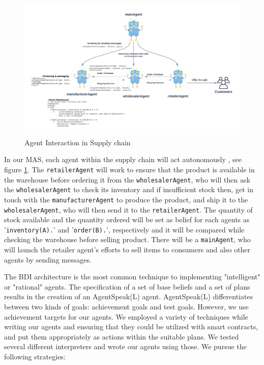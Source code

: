 \begin{figure}[h!]
    \centering
      \includegraphics[width=\linewidth]{includes/figures/agent.png} 
      \caption{Agent Interaction in Supply chain}
      \label{Agent Interaction}
    \end{figure}
  
\vspace{.5cm}

In our \ac{MAS}, each agent within the supply chain will act autonomously , see figure \ref{Agent Interaction}. The \texttt{retailerAgent} will work to ensure that the product is available in the warehouse before ordering it from the \texttt{wholesalerAgent}, who will then ask the \texttt{wholesalerAgent} to check its inventory and if insufficient stock then, get in touch with the \texttt{manufacturerAgent} to produce the product, and ship it to the \texttt{wholesalerAgent}, who will then send it to the \texttt{retailerAgent}. The quantity of stock available and the quantity ordered will be set as belief for each agents as '\texttt{inventory(A).}' and '\texttt{order(B).}', respectively and it will be compared while checking the warehouse before selling product. There will be a \texttt{mainAgent}, who will launch the retailer agent's efforts to sell items to consumers and also other agents by sending messages.

\vspace{.5cm}

The \ac{BDI} architecture is the most common technique to implementing "intelligent" or "rational" agents. The specification of a set of base beliefs and a set of plans results in the creation of an AgentSpeak(L) agent. AgentSpeak(L) differentiates between two kinds of goals: achievement goals and test goals. However, we use achievement targets for our agents. We employed a variety of techniques while writing our agents and ensuring that they could be utilized with smart contracts, and put them appropriately as actions within the suitable plans. We tested several different interpreters and wrote our agents using those. We pursue the following strategies:
 \vspace{.3cm }

